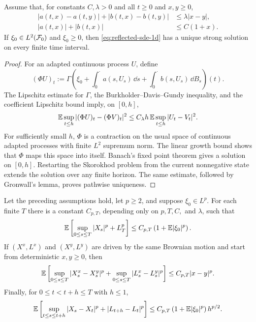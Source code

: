 \begin{theorem}
Assume that, for constants $C,\lambda>0$ and all $t\geq0$ and $x,y\geq0$,
\begin{align*}
  |a(t,x)-a(t,y)|+|b(t,x)-b(t,y)|&\leq\lambda|x-y|,\\
  |a(t,x)|+|b(t,x)|&\leq C(1+x).
\end{align*}
If $\xi_0\in L^2(\mathcal F_0)$ and $\xi_0\geq0$, then
\eqref{eq:reflected-sde-1d} has a unique strong solution on every finite time
interval.
\end{theorem}

\begin{proof}
For an adapted continuous process $U$, define
\[
  (\Phi U)_t
  :=\Gamma\!\left(
      \xi_0+\int_0^{\cdot}a(s,U_s)\,\dd s
      +\int_0^{\cdot}b(s,U_s)\,\dd B_s
    \right)(t).
\]
The Lipschitz estimate for $\Gamma$, the Burkholder--Davis--Gundy inequality,
and the coefficient Lipschitz bound imply, on $[0,h]$,
\[
  \mathbb E\sup_{t\leq h}|(\Phi U)_t-(\Phi V)_t|^2
  \leq C_\lambda h\,
        \mathbb E\sup_{t\leq h}|U_t-V_t|^2.
\]
For sufficiently small $h$, $\Phi$ is a contraction on the usual space of
continuous adapted processes with finite $L^2$ supremum norm. The linear
growth bound shows that $\Phi$ maps this space into itself. Banach's fixed
point theorem gives a solution on $[0,h]$. Restarting the Skorokhod problem
from the current nonnegative state extends the solution over any finite
horizon. The same estimate, followed by Gronwall's lemma, proves pathwise
uniqueness.
\end{proof}

\begin{theorem}
Let the preceding assumptions hold, let $p\geq2$, and suppose
$\xi_0\in L^p$. For each finite $T$ there is a constant
$C_{p,T}$, depending only on $p,T,C,$ and $\lambda$, such that
\begin{equation}
  \mathbb E\left[\sup_{0\leq s\leq T}|X_s|^p+L_T^p\right]
  \leq C_{p,T}\left(1+\mathbb E|\xi_0|^p\right). \label{eq:moment-reflected}
\end{equation}
If $(X^x,L^x)$ and $(X^y,L^y)$ are driven by the same Brownian motion and
start from deterministic $x,y\geq0$, then
\begin{equation}
  \mathbb E\left[\sup_{0\leq s\leq T}|X_s^x-X_s^y|^p
          +\sup_{0\leq s\leq T}|L_s^x-L_s^y|^p\right]
  \leq C_{p,T}|x-y|^p. \label{eq:initial-stability}
\end{equation}
Finally, for $0\leq t<t+h\leq T$ with $h\leq1$,
\begin{equation}
  \mathbb E\left[
    \sup_{t\leq s\leq t+h}|X_s-X_t|^p
    +|L_{t+h}-L_t|^p
  \right]
  \leq C_{p,T}\left(1+\mathbb E|\xi_0|^p\right)h^{p/2}. \label{eq:time-increments}
\end{equation}
\end{theorem}


